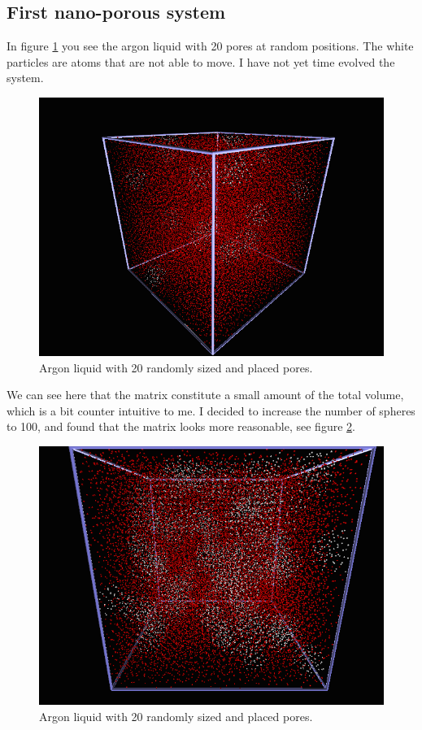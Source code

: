 \subsection{First nano-porous system}
In figure \ref{pores_20} you see the argon liquid with 20 pores at random positions. The white particles are atoms that are not able to move. I have not yet time evolved the system.
\begin{figure}[H]
 \centering
 \includegraphics[width=12 cm]{./figures/pores_20.png}
 \caption{Argon liquid with 20 randomly sized and placed pores.}
 \label{pores_20}
\end{figure}

We can see here that the matrix constitute a small amount of the total volume, which is a bit counter intuitive to me. I decided to increase the number of spheres to 100, and found that 
the matrix looks more reasonable, see figure \ref{pores_100}.
\begin{figure}[H]
 \centering
 \includegraphics[width=12 cm]{./figures/pores_100.png}
 \caption{Argon liquid with 20 randomly sized and placed pores.}
 \label{pores_100}
\end{figure}

